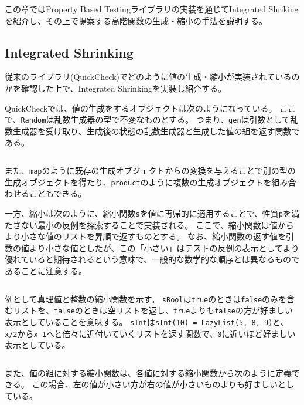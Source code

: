 \documentclass[submit,PRO,onecolumn]{ipsj}
\theoremstyle{definition}
\begin{document}
この章ではProperty Based Testingライブラリの実装を通じてIntegrated Shrikingを紹介し、その上で提案する高階関数の生成・縮小の手法を説明する。

\subsection{Integrated Shrinking}

従来のライブラリ(QuickCheck\cite{claessen_quickcheck_2011})でどのように値の生成・縮小が実装されているのかを確認した上で、Integrated Shrinkingを実装し紹介する。

QuickCheckでは、値の生成をするオブジェクトは次のようになっている。
ここで、\texttt{Random}は乱数生成器の型で不変なものとする。
つまり、\texttt{gen}は引数として乱数生成器を受け取り、生成後の状態の乱数生成器と生成した値の組を返す関数である。

\inputminted[breaklines,firstline=31,lastline=35]{scala}{../src/main/scala/minicheck.scala}

また、\texttt{map}のように既存の生成オブジェクトからの変換を与えることで別の型の生成オブジェクトを得たり、\texttt{product}のように複数の生成オブジェクトを組み合わせることもできる。

一方、縮小は次のように、縮小関数\texttt{s}を値に再帰的に適用することで、性質\texttt{p}を満たさない最小の反例を探索することで実装される。
ここで、縮小関数は値からより小さな値のリストを昇順で返すものとする。
なお、縮小関数の返す値を引数の値より小さな値としたが、この「小さい」はテストの反例の表示としてより優れていると期待されるという意味で、一般的な数学的な順序とは異なるものであることに注意する。

\inputminted[breaklines,firstline=37,lastline=38]{scala}{../src/main/scala/minicheck.scala}

例として真理値と整数の縮小関数を示す。
\texttt{sBool}は\texttt{true}のときは\texttt{false}のみを含むリストを、\texttt{false}のときは空リストを返し、\texttt{true}よりも\texttt{false}の方が好ましい表示としていることを意味する。
\texttt{sInt}は\texttt{sInt(10) = LazyList(5, 8, 9)}と、\texttt{x/2}から\texttt{x-1}へと倍々に近付いていくリストを返す関数で、\texttt{0}に近いほど好ましい表示としている。

\inputminted[breaklines,firstline=40,lastline=43]{scala}{../src/main/scala/minicheck.scala}

また、値の組に対する縮小関数は、各値に対する縮小関数から次のように定義できる。
この場合、左の値が小さい方が右の値が小さいものよりも好ましいとしている。

\inputminted[breaklines,firstline=45,lastline=47]{scala}{../src/main/scala/minicheck.scala}
\end{document}
